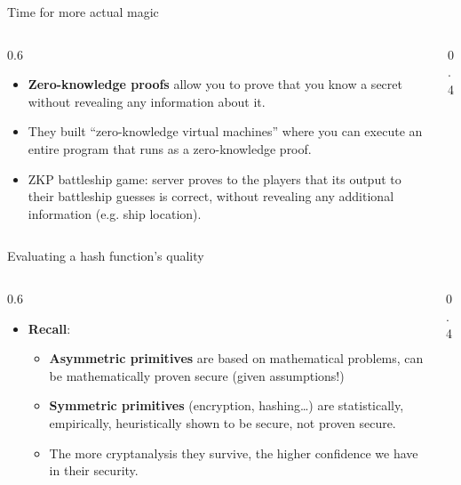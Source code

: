 \documentclass[aspectratio=169, lualatex, handout]{beamer}
\begin{document}
	\begin{frame}{Time for more actual magic}
		\begin{columns}[c]
			\begin{column}{0.6\textwidth}
				\begin{itemize}
					\item \textbf{Zero-knowledge proofs} allow you to prove that you know
						a secret without revealing any information about it.

					\item They built ``zero-knowledge virtual machines'' where you can execute
						an entire program that runs as a zero-knowledge proof.

					\item ZKP battleship game: server proves to the players that its
						output to their battleship guesses is correct, without revealing any
						additional information (e.g. ship location).
				\end{itemize}
			\end{column}

			\begin{column}{0.4\textwidth}
			\end{column}
		\end{columns}
	\end{frame}

	\begin{frame}{Evaluating a hash function's quality}
		\begin{columns}[c]
			\begin{column}{0.6\textwidth}
				\begin{itemize}
					\item \textbf{Recall}:
						\begin{itemize}
							\item \textbf{Asymmetric primitives} are based on mathematical
								problems, can be mathematically proven secure (given assumptions!)

							\item \textbf{Symmetric primitives} (encryption, hashing\ldots)
								are statistically, empirically, heuristically shown to be secure,
								not proven secure.

							\item The more cryptanalysis they survive, the higher confidence
								we have in their security.
						\end{itemize}
				\end{itemize}
			\end{column}

			\begin{column}{0.4\textwidth}
			\end{column}
		\end{columns}
	\end{frame}
\end{document}
